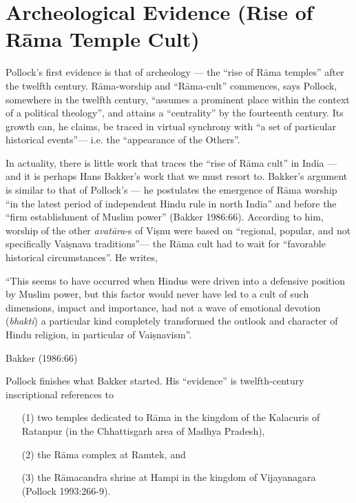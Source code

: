 \newpage

\section{Archeological Evidence (Rise of Rāma Temple Cult)}\label{sec3.1}

Pollock’s first evidence is that of archeology — the “rise of Rāma temples” after the twelfth century. Rāma-worship and “Rāma-cult” commences, says Pollock, somewhere in the twelfth century, “assumes a prominent place within the context of a political theology”, and attains a “centrality” by the fourteenth century. Its growth can, he claims, be traced in virtual synchrony with “a set of particular historical events”— i.e. the “appearance of the Others”. 

In actuality, there is little work that traces the “rise of Rāma cult” in India — and it is perhaps Hans Bakker’s work that we must resort to. Bakker’s argument is similar to that of Pollock’s — he postulates the emergence of Rāma worship “in the latest period of independent Hindu rule in north India” and before the “firm establishment of Muslim power” (Bakker 1986:66). According to him, worship of the other {\sl avatāra}-s of Viṣnu were based on “regional, popular, and not specifically Vaiṣnava traditions”— the Rāma cult had to wait for “favorable historical circumstances”. He writes,  

\begin{myquote}
“This seems to have occurred when Hindus were driven into a defensive position by Muslim power, but this factor would never have led to a cult of such dimensions, impact and importance, had not a wave of emotional devotion ({\sl bhakti}) a particular kind completely transformed the outlook and character of Hindu religion, in particular of Vaiṣnavism”.

\hfill Bakker (1986:66)
\end{myquote}

Pollock finishes what Bakker started. His “evidence” is twelfth-century inscriptional references to 

\begin{itemize}
\item[(1)] two temples dedicated to Rāma in the kingdom of the Kalacuris of Ratanpur (in the Chhattisgarh area of Madhya Pradesh), 

\item[(2)] the Rāma complex at Ramtek, and 

\item[(3)] the Rāmacandra shrine at Hampi in the kingdom of Vijayanagara  (Pollock 1993:266-9). 
\end{itemize}

